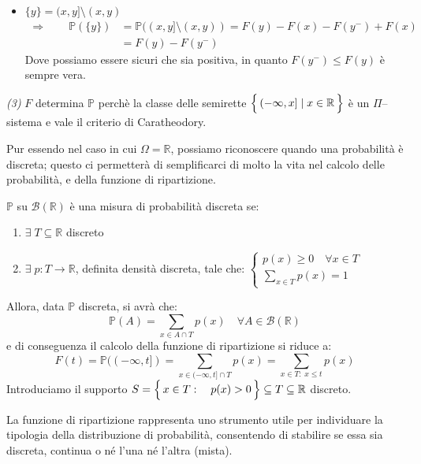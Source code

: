 \begin{dimostrazione}
\begin{itemize}
            \begin{align*}
                \Rightarrow\qquad\mathbb{P}((x,y)) &= \mathbb{P}\left(\bigcup_{n}\left(x, y-\frac{1}{n}\right)\right)= \lim_{n\to\infty}\mathbb{P}\left(x, y-\frac{1}{n}\right) \\
                &\!\!\!\!\!\!\!\overset{\text{Punto prec.}}{=}\lim_{n\to\infty}\left(F\left(y-\frac{1}{n}\right)-F(x)\right)\\
                &=F(y^-) - F(x)
            \end{align*}
            \item $\{y\} = (x, y]\setminus(x, y)$
            \begin{align*}
                \Rightarrow\qquad\mathbb{P}(\{y\}) &= \mathbb{P}((x, y]\setminus(x, y)) = F(y) - F(x) - F(y^-)+F(x)\\
                &= F(y) - F(y^-)
            \end{align*}
            Dove possiamo essere sicuri che sia positiva, in quanto $F(y^-)\leq F(y)$ è sempre vera.
        \end{itemize}
        \textit{(3)} $F$ determina $\mathbb{P}$ perchè la classe delle semirette $\Bigl\{\,(-\infty, x] \mid x\in\mathbb{R}\,\Bigr\}$ è un $\Pi$--sistema e vale il criterio di Caratheodory.
    \end{dimostrazione}

\noindent
Pur essendo nel caso in cui $\Omega = \mathbb{R}$, possiamo riconoscere quando una probabilità è discreta; questo ci permetterà di semplificarci di molto la vita nel calcolo delle probabilità, e della funzione di ripartizione.  

\begin{teorema}
\label{th:pdiscreta}
    $\mathbb{P}$ su $\mathcal{B}(\mathbb{R})$ è una misura di probabilità discreta se:
    \begin{enumerate}
        \item $\exists \;T\subseteq\mathbb{R}$ discreto
        \item $\exists \; p:T\rightarrow\mathbb{R}$, definita densità discreta, tale che: 
        \(\begin{cases}
            p(x)\geq 0\quad \forall x\in T\\
            \sum_{x\in T}p(x) = 1
        \end{cases}\)
    \end{enumerate}
    \noindent Allora, data $\mathbb{P}$ discreta, si avrà che: 
        \[\mathbb{P}(A) = \sum_{x\in A\cap T}p(x)\quad \forall A\in \mathcal{B}(\mathbb{R})\]
        e di conseguenza il calcolo della funzione di ripartizione si riduce a:
        \[F(t) =\mathbb{P}((-\infty, t]) = \sum_{x\in (-\infty, t]\cap T} p(x) = \sum_{x\in T:\;x\leq t}p(x)\]
    \noindent Introduciamo il supporto $S = \Bigl\{\,x\in T:\quad p(x)>0\,\Bigr\}\subseteq T\subseteq\mathbb{R}$ discreto.
\end{teorema}
La funzione di ripartizione rappresenta uno strumento utile per individuare la tipologia della distribuzione di probabilità, consentendo di stabilire se essa sia discreta, continua o né l'una né l'altra (mista).

